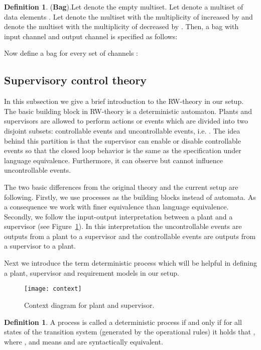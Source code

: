 \documentclass[a4paper,english,final]{article}
\theoremstyle{plain}
\theoremstyle{definition}
\newtheorem{definition}[theorem]{Definition}
\begin{document}
\begin{definition}{(\textbf{Bag}).}\label{buffdef}
Let  denote the empty multiset. Let  denote a multiset of data elements . Let  denote the multiset  with the multiplicity of  increased by  and  denote the multiset  with the multiplicity of  decreased by . Then, a bag with input channel  and output channel  is specified as follows:

Now define a bag for every set of channels :\newline

\end{definition}

\subsection{Supervisory control theory}\label{rwtheory}
In this subsection we give a brief introduction to the RW-theory in our setup. The basic building block in RW-theory is a deterministic automaton. Plants and supervisors are allowed to perform actions or events which are divided into two disjoint subsets: controllable events and uncontrollable events, i.e. . The idea behind this partition is that the supervisor can enable or disable controllable events so that the closed loop behavior is the same as the specification under language equivalence. Furthermore, it can observe but cannot influence uncontrollable events.

The two basic differences from the original theory and the current setup are following. Firstly, we use processes as the building blocks instead of automata. As a consequence we work with finer equivalence than language equivalence. Secondly, we follow the input-output interpretation \cite{balemiphdt} between a plant and a supervisor (see Figure~\ref{context}). In this interpretation the uncontrollable events are outputs from a plant to a supervisor and the controllable events are outputs from a supervisor to a plant.

Next we introduce the term deterministic process which will be helpful in defining a plant, supervisor and requirement models in our setup.
\begin{figure}
\centering
  \texttt{[image: context]}\\
  \caption{Context diagram for plant and supervisor.}\label{context}
\end{figure}

\begin{definition}
A process  is called a deterministic process \citep{acpbook} if and only if for all states  of the transition system (generated by the operational rules) it holds that , where , and  means  and  are syntactically equivalent.
\end{definition}
\end{document}
